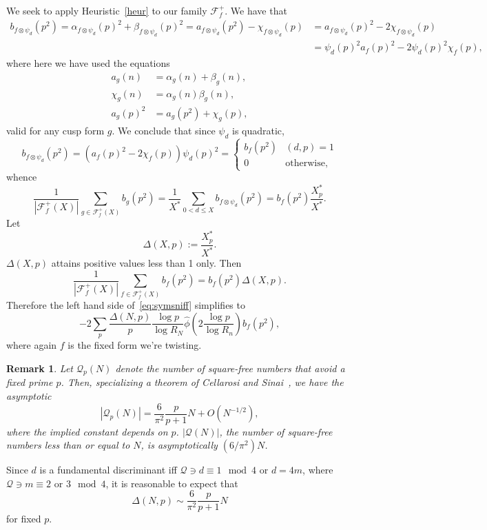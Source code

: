 \documentclass[11pt,reqno]{amsart} \usepackage{fullpage}
\newtheorem{remark}[lemma]{Remark}
\renewcommand{\leq}{\leqslant}
\newcommand{\F}{\ensuremath{\mathbf{F}}}
\newcommand\be{\begin{equation}}
\newcommand\ee{\end{equation}}
\renewcommand{\F}{\mathcal F_f}
\numberwithin{equation}{section}
\begin{document}
We seek to apply Heuristic~\ref{heur} to our family $\F^+$. We have that
\begin{align}
  b_{f\otimes\psi_d}\left(p^2\right)
  =\alpha_{f\otimes\psi_d}(p)^2+\beta_{f\otimes\psi_d}(p)^2
  =a_{f\otimes\psi_d}\left(p^2\right)-\chi_{f\otimes\psi_d}(p)
  &=a_{f\otimes\psi_d}(p)^2-2\chi_{f\otimes\psi_d}(p) \\
  &=\psi_d(p)^2a_f(p)^2-2\psi_d(p)^2\chi_f(p),
\end{align}
where here we have used the equations
\begin{align}
  a_g(n)&=\alpha_g(n)+\beta_g(n), \\ \chi_g(n)&=\alpha_g(n)\beta_g(n), \\
  a_g(p)^2&=a_g\left(p^2\right)+\chi_g(p),
\end{align} valid for any cusp form $g$. We conclude that since $\psi_d$ is quadratic,
\be b_{f\otimes\psi_d}\left(p^2\right)=\left(a_f(p)^2-2\chi_f(p)\right)\psi_d(p)^2
=\begin{cases}b_f\left(p^2\right)&(d,p)=1 \\ 0&\text{otherwise},\end{cases}\ee
whence \be\frac1{\left|\F^+(X)\right|}\sum_{g\in\F^+(X)}b_g\left(p^2\right)
=\frac1{X^\ast}\sum_{0<d\leq X}b_{f\otimes\psi_d}\left(p^2\right)
=b_{f}\left(p^2\right)\frac{X^\ast_p}{X^\ast}.\ee
Let \be\Delta(X,p):=\frac{X^\ast_p}{X^\ast}.\ee $\Delta(X,p)$ attains positive values less
than 1 only. Then
\be\frac1{\left|\F^+(X)\right|}\sum_{f\in\F^+(X)}b_f\left(p^2\right)
=b_f\left(p^2\right)\Delta(X,p).\ee Therefore the left hand side of~\eqref{eq:symsniff}
simplifies to \be\label{eq:sniffapplied}-2\sum_p\frac{\Delta(N,p)}p\frac{\log p}{\log R_N}
\hat\phi\left(2\frac{\log p}{\log R_n}\right)b_f\left(p^2\right),\ee where again $f$ is the
fixed form we're twisting.
\begin{remark} Let $\mathcal Q_p(N)$ denote the number of square-free numbers that avoid
  a fixed prime $p$. Then, specializing a theorem of Cellarosi and
  Sinai~\cite[Theorem 2.3]{CS}, we have the asymptotic
  \be\left|\mathcal Q_p(N)\right|=\frac6{\pi^2}\frac p{p+1}N+O\left(N^{-1/2}\right),\ee
  where the implied constant depends on $p$. $\left|\mathcal Q(N)\right|$, the number of
  square-free numbers less than or equal to $N$, is asymptotically $(6/\pi^2)N$.\end{remark}
Since $d$ is a fundamental discriminant iff $\mathcal Q\ni d\equiv1\mod4$ or
$d=4m$, where $\mathcal Q\ni m\equiv2\text{ or }3\mod4$, it is reasonable to expect that
\be\Delta(N,p)\sim\frac6{\pi^2}\frac p{p+1}N\ee for fixed $p$.
\end{document}
